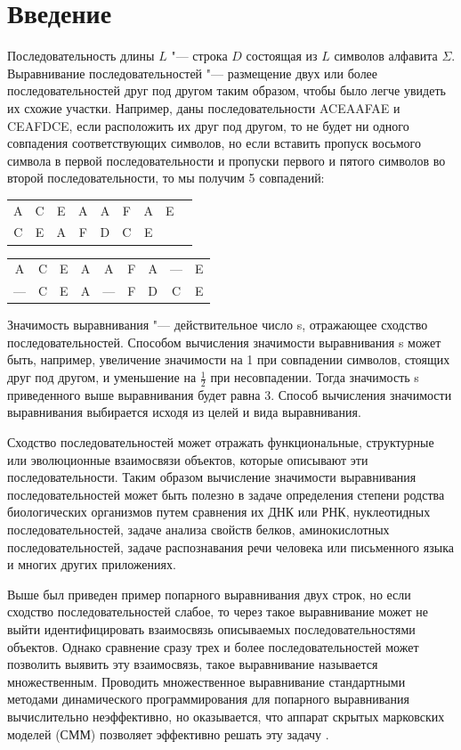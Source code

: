 \documentclass[]{article}
\begin{document}
	\section{Введение}
		Последовательность длины $L$ "--- строка $D$ состоящая из $L$ символов алфавита $\Sigma$. Выравнивание последовательностей  "--- размещение двух или более последовательностей друг под другом таким образом, чтобы было легче увидеть их схожие участки. Например, даны последовательности ACEAAFAE и CEAFDCE, если расположить их друг под другом, то не будет ни одного совпадения соответствующих символов, но если вставить пропуск восьмого символа в первой последовательности и пропуски первого и пятого символов во второй последовательности, то мы получим 5 совпадений:
		\begin{center}
			\begin{tabular}{ccccccccc}
				A&C&E&A&A&F&A&E\\
				C&E&A&F&D&C&E\\
			\end{tabular}
		\end{center}
		\begin{center}
			\begin{tabular}{ccccccccc}
				A&C&E&A&A&F&A&—&E\\
				—&C&E&A&—&F&D&C&E\\
			\end{tabular}
		\end{center}
		Значимость выравнивания "--- действительное число s, отражающее сходство последовательностей. Способом вычисления значимости выравнивания s может быть, например, увеличение значимости на 1 при совпадении символов, стоящих друг под другом, и уменьшение на $\frac{1}{2}$ при несовпадении. Тогда значимость s приведенного выше выравнивания будет равна 3. Способ вычисления значимости выравнивания выбирается исходя из целей и вида выравнивания.
		
		Сходство последовательностей может отражать функциональные, структурные или эволюционные взаимосвязи объектов, которые описывают эти последовательности. Таким образом вычисление значимости выравнивания последовательностей может быть полезно в задаче определения степени родства биологических организмов путем сравнения их ДНК или РНК, нуклеотидных последовательностей, задаче анализа свойств белков, аминокислотных последовательностей, задаче распознавания речи человека или письменного языка и многих других приложениях.
		
		Выше был приведен пример попарного выравнивания двух строк, но если сходство последовательностей слабое, то через такое выравнивание может не выйти идентифицировать взаимосвязь описываемых последовательностями объектов. Однако сравнение сразу трех и более последовательностей может позволить выявить эту взаимосвязь, такое выравнивание называется множественным. Проводить множественное выравнивание стандартными методами динамического программирования для попарного выравнивания \cite{Compeau15_1} вычислительно неэффективно, но оказывается, что аппарат скрытых марковских моделей (СММ) позволяет эффективно решать эту задачу \cite{Dugad96, Compeau15_2}. 
		
\end{document}
